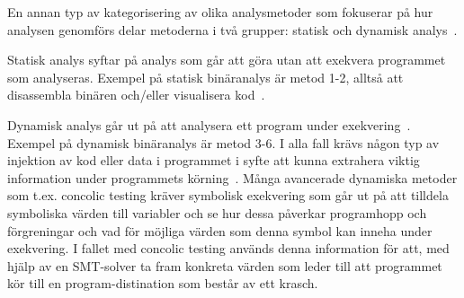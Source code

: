 En annan typ av kategorisering av olika analysmetoder som fokuserar på hur
analysen genomförs delar metoderna i två grupper: statisk och dynamisk
analys~\cite{dynamic_bin_analysis}.

Statisk analys syftar på analys som går att göra utan att exekvera programmet
som analyseras. Exempel på statisk binäranalys är metod 1-2, alltså att
disassembla binären och/eller visualisera kod~\cite{dynamic_bin_analysis}.

Dynamisk analys går ut på att analysera ett program under
exekvering~\cite{dynamic_bin_analysis}. Exempel på dynamisk binäranalys är
metod 3-6. I alla fall krävs någon typ av injektion av kod eller data i
programmet i syfte att kunna extrahera viktig information under programmets
körning~\cite{dynamic_bin_analysis}. Många avancerade dynamiska metoder som
t.ex. concolic testing kräver symbolisk exekvering som går ut på att tilldela
symboliska värden till variabler och se hur dessa påverkar programhopp och
förgreningar och vad för möjliga värden som denna symbol kan inneha under
exekvering. I fallet med concolic testing används denna information för att,
med hjälp av en SMT-solver ta fram konkreta värden som leder till att
programmet kör till en program-distination som består av ett krasch.
